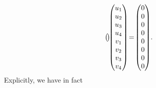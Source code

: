 \documentclass[11pt]{article}
\numberwithin{equation}{section}
\numberwithin{equation}{section}
\theoremstyle{definition}
\newcommand{\0}{\boldsymbol{0}}
\begin{document}
\begin{gather*}
\begin{pmatrix}
\hspace{-1.5pt}\end{pmatrix} \hspace{-3.5pt}
\begin{pmatrix}
u_1
\\
u_2
\\
u_3
\\
u_4
\\
v_1
\\
v_2
\\
v_3
\\
v_4
\end{pmatrix} \!=\!
\begin{pmatrix}
0
\\
0
\\
0
\\
0
\\
0
\\
0
\\
0
\\
0
\end{pmatrix}\!.
\end{gather*}
Explicitly, we have in fact
\end{document}

